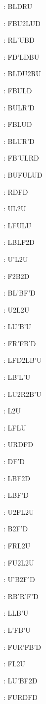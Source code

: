 \documentclass[9pt]{article}
\begin{document}
{\begin{multicols}{6}
: BLDRU

: FBU2LUD

: RL'UBD

: FD'LDBU

: BLDU2RU

: FBULD

: BULR'D

: FBLUD

: BLUR'D

: FB'ULRD

: BUFULUD

: RDFD

: UL2U

: LFULU

: LBLF2D

: U'L2U

: F2B2D

: BL'BF'D

: U2L2U

: LU'B'U

: FR'FB'D

: LFD2LB'U

: LB'L'U

: LU2R2B'U

: L2U

: LFLU

: URDFD

: DF'D

: LBF2D

: LBF'D

: U2FL2U

: B2F'D

: FRL2U

: FU2L2U

: U'B2F'D

: RB'R'F'D

: LLB'U

: L'FB'U

: FUR'FB'D

: FL2U

: LU'BF2D

: FURDFD


\end{multicols}}
\end{document}
